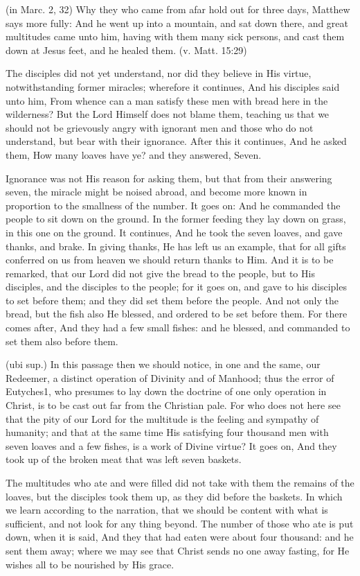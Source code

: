  (in Marc. 2, 32) Why they who came from afar hold out for three days, Matthew says more fully: And he went up into a mountain, and sat down there, and great multitudes came unto him, having with them many sick persons, and cast them down at Jesus feet, and he healed them. (v. Matt. 15:29)

 The disciples did not yet understand, nor did they believe in His virtue, notwithstanding former miracles; wherefore it continues, And his disciples said unto him, From whence can a man satisfy these men with bread here in the wilderness? But the Lord Himself does not blame them, teaching us that we should not be grievously angry with ignorant men and those who do not understand, but bear with their ignorance. After this it continues, And he asked them, How many loaves have ye? and they answered, Seven.

 Ignorance was not His reason for asking them, but that from their answering seven, the miracle might be noised abroad, and become more known in proportion to the smallness of the number. It goes on: And he commanded the people to sit down on the ground. In the former feeding they lay down on grass, in this one on the ground. It continues, And he took the seven loaves, and gave thanks, and brake. In giving thanks, He has left us an example, that for all gifts conferred on us from heaven we should return thanks to Him. And it is to be remarked, that our Lord did not give the bread to the people, but to His disciples, and the disciples to the people; for it goes on, and gave to his disciples to set before them; and they did set them before the people. And not only the bread, but the fish also He blessed, and ordered to be set before them. For there comes after, And they had a few small fishes: and he blessed, and commanded to set them also before them.

 (ubi sup.) In this passage then we should notice, in one and the same, our Redeemer, a distinct operation of Divinity and of Manhood; thus the error of Eutyches1, who presumes to lay down the doctrine of one only operation in Christ, is to be cast out far from the Christian pale. For who does not here see that the pity of our Lord for the multitude is the feeling and sympathy of humanity; and that at the same time His satisfying four thousand men with seven loaves and a few fishes, is a work of Divine virtue? It goes on, And they took up of the broken meat that was left seven baskets.

 The multitudes who ate and were filled did not take with them the remains of the loaves, but the disciples took them up, as they did before the baskets. In which we learn according to the narration, that we should be content with what is sufficient, and not look for any thing beyond. The number of those who ate is put down, when it is said, And they that had eaten were about four thousand: and he sent them away; where we may see that Christ sends no one away fasting, for He wishes all to be nourished by His grace.

